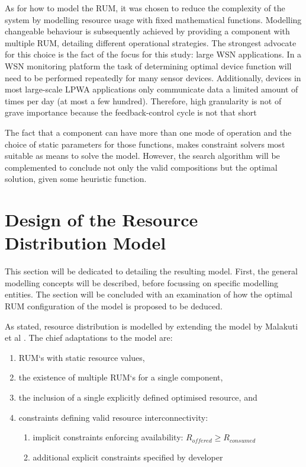 As for how to model the RUM, it was chosen to reduce the complexity of the system by modelling resource usage with fixed mathematical functions. Modelling changeable behaviour is subsequently achieved by providing a component with multiple RUM, detailing different operational strategies. The strongest advocate for this choice is the fact of the focus for this study: large WSN applications. In a WSN monitoring platform the task of determining optimal device function will need to be performed repeatedly for many sensor devices. Additionally, devices in most large-scale LPWA applications only communicate data a limited amount of times per day (at most a few hundred)\cite{nbiot_battery_not_suitable, lora_vs_sigfox_boek}. Therefore, high granularity is not of grave importance because the feedback-control cycle is not that short

The fact that a component can have more than one mode of operation and the choice of static parameters for those functions, makes constraint solvers most suitable as means to solve the model. However, the search algorithm will be complemented to conclude not only the valid compositions but the optimal solution, given some heuristic function.

\section{Design of the Resource Distribution Model}
This section will be dedicated to detailing the resulting model. First, the general modelling concepts will be described, before focussing on specific modelling entities. The section will be concluded with an examination of how the optimal RUM configuration of the model is proposed to be deduced.

As stated, resource distribution is modelled by extending the model by Malakuti et al \cite{steven_te_brinke}. The chief adaptations to the model are:
\begin{enumerate}
\nospace
\item RUM`s with static resource values,
\item the existence of multiple RUM`s for a single component,
\item the inclusion of a single explicitly defined optimised resource, and
\item constraints defining valid resource interconnectivity:
\begin{enumerate}
\nospace
\item implicit constraints enforcing availability: $R_{offered} \geq R_{consumed}$
\item additional explicit constraints specified by developer
\end{enumerate}
\end{enumerate}


